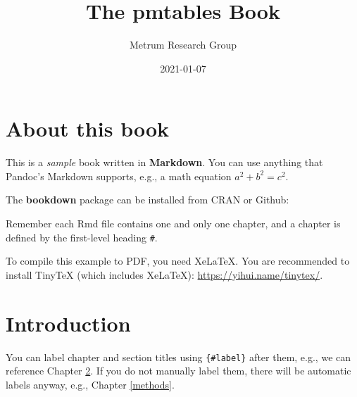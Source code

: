 \documentclass[
]{book}
\title{The pmtables Book}
\author{Metrum Research Group}
\date{2021-01-07}
\newenvironment{Shaded}{\begin{snugshade}}{\end{snugshade}}
\newcommand{\KeywordTok}[1]{\textcolor[rgb]{0.13,0.29,0.53}{\textbf{#1}}}
\newcommand{\NormalTok}[1]{#1}
\newcommand{\OperatorTok}[1]{\textcolor[rgb]{0.81,0.36,0.00}{\textbf{#1}}}
\newcommand{\StringTok}[1]{\textcolor[rgb]{0.31,0.60,0.02}{#1}}
\begin{document}
\maketitle

{
\setcounter{tocdepth}{1}
\tableofcontents
}
\hypertarget{about-this-book}{%
\chapter{About this book}\label{about-this-book}}

This is a \emph{sample} book written in \textbf{Markdown}. You can use anything that Pandoc's Markdown supports, e.g., a math equation \(a^2 + b^2 = c^2\).

The \textbf{bookdown} package can be installed from CRAN or Github:

Remember each Rmd file contains one and only one chapter, and a chapter is defined by the first-level heading \texttt{\#}.

To compile this example to PDF, you need XeLaTeX. You are recommended to install TinyTeX (which includes XeLaTeX): \url{https://yihui.name/tinytex/}.

\hypertarget{intro}{%
\chapter{Introduction}\label{intro}}

You can label chapter and section titles using \texttt{\{\#label\}} after them, e.g., we can reference Chapter \ref{intro}. If you do not manually label them, there will be automatic labels anyway, e.g., Chapter \ref{methods}.

\begin{Shaded}
\end{Shaded}
\end{document}
